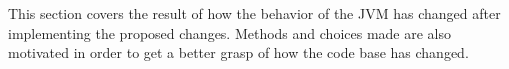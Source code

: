 
This section covers the result of how the behavior of the JVM has changed after implementing the proposed changes. Methods and choices made are also motivated in order to get a better grasp of how the code base has changed.
